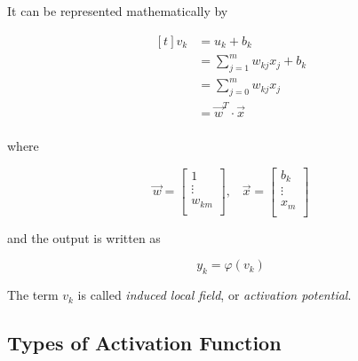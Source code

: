 \documentclass[twocolumn]{article}
\newcommand{\somatorio}{\displaystyle\sum}
\begin{document}
 It can be represented mathematically by

 $$ \begin{aligned}[t]
		 v_{k} & = u_{k} + b_{k}                             \\
		       & = \somatorio_{j = 1}^{m}w_{kj}x_{j} + b_{k} \\
		       & = \somatorio_{j = 0}^{m}w_{kj}x_{j}         \\
		       & = \vec{w}^{T}\cdot \vec{x}                  \\
	 \end{aligned} $$

 \noindent where

 $$ \vec{w} =
	 \begin{bmatrix}
		 1      \\
		 \vdots \\
		 w_{km} \\
	 \end{bmatrix}
	 , \;\;\;
	 \vec{x} =
	 \begin{bmatrix}
		 b_{k}  \\
		 \vdots \\
		 x_{m}  \\
	 \end{bmatrix}
 $$

 \noindent and the output is written as

 $$ y_{k} = \varphi (v_{k}) $$

 The term $ v_k $ is called \textit{induced local field}, or \textit{activation potential}.

 \subsection{Types of Activation Function}
\end{document}
